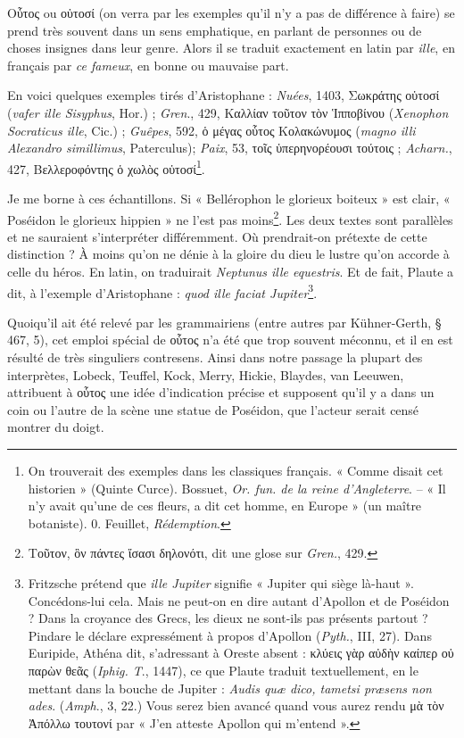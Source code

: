 \documentclass{book}%
\newcommand{\italique}[1]{\textit{#1}}%
\newcommand{\note}[1]{\footnote{#1}}
\begin{document}
Οὗτος ou οὑτοσί (on verra par les exemples qu'il n'y a pas de différence à faire) se prend très souvent dans un sens emphatique, en parlant de personnes ou de choses insignes dans leur genre. Alors il se traduit exactement en latin par \italique{ille}, en français par \italique{ce fameux}, en bonne ou mauvaise part. 

En voici quelques exemples tirés d'Aristophane : \italique{Nuées}, 1403, Σωκράτης οὑτοσί (\italique{vafer ille Sisyphus}, Hor.) ; \italique{Gren}., 429, Καλλίαν τοῦτον τὸν Ἱπποβίνου (\italique{Xenophon Socraticus ille}, Cic.) ; \italique{Guêpes}, 592, ὁ μέγας οὗτος Κολακώνυμος (\italique{magno illi Alexandro simillimus}, Paterculus); \italique{Paix}, 53, τοῖς ὑπερηνορέουσι τούτοις ; \italique{Acharn.}, 427, Βελλεροφόντης ὁ χωλὸς οὑτοσί\note{On trouverait des exemples dans les classiques français. « Comme disait cet historien » (Quinte Curce). Bossuet, \italique{Or. fun. de la reine d'Angleterre}. -- « Il n'y avait qu'une de ces fleurs, a dit cet homme, en Europe » (un maître botaniste). 0. Feuillet, \italique{Rédemption}.}. 

Je me borne à ces échantillons. Si « Bellérophon le glorieux boiteux » est clair, « Poséidon le glorieux hippien » ne l'est pas moins\note{Τοῦτον, ὃν πάντες ἵσασι δηλονότι, dit une glose sur \italique{Gren.}, 429.}. Les deux textes sont parallèles et ne sauraient s'interpréter différemment. Où prendrait-on prétexte de cette distinction ? À moins qu'on ne dénie à la gloire du dieu le lustre qu'on accorde à celle du héros. 
En latin, on traduirait \italique{Neptunus ille equestris}. Et de fait, Plaute a dit, à l'exemple d'Aristophane : \italique{quod ille faciat Jupiter}\note{Fritzsche prétend que \italique{ille Jupiter} signifie « Jupiter qui siège là-haut ». Concédons-lui cela. Mais ne peut-on en dire autant d'Apollon et de Poséidon ? Dans la croyance des Grecs, les dieux ne sont-ils pas présents partout ? Pindare le déclare expressément à propos d'Apollon (\italique{Pyth.}, III, 27). Dans Euripide, Athéna dit, s'adressant à Oreste absent : κλύεις γὰρ αὐδὴν καίπερ οὐ παρὼν θεᾶς (\italique{Iphig. T}., 1447), ce que Plaute traduit textuellement, en le mettant dans la bouche de Jupiter : \italique{Audis quæ dico, tametsi præsens non ades}. (\italique{Amph}., 3, 22.) Vous serez bien avancé quand vous aurez rendu μὰ τὸν Ἀπόλλω τουτονί par « J'en atteste Apollon qui m'entend ».}. 

Quoiqu'il ait été relevé par les grammairiens (entre autres par Kühner-Gerth, § 467, 5), cet emploi spécial de οὗτος n'a été que trop souvent méconnu, et il en est résulté de très singuliers contresens. Ainsi dans notre passage la plupart des interprètes, Lobeck, Teuffel, Kock, Merry, Hickie, Blaydes, van Leeuwen, attribuent à οὗτος une idée d'indication précise et supposent qu'il y a dans un coin ou l'autre de la scène une statue de Poséidon, que l'acteur serait censé montrer du doigt.
\end{document}
